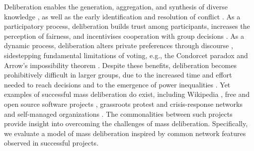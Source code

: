 \documentclass[twocolumn,10pt]{article}
\begin{document}
Deliberation enables the generation, aggregation, and synthesis of diverse knowledge \cite{dewey_creative_1940, anderson_epistemology_2006, ackerman_deliberation_2002, ostrom_collective_2000},
as well as the early identification and resolution of conflict \cite{gentry_consensus_1982}.
As a participatory process, deliberation builds trust among participants, increases the perception of fairness, and incentivises cooperation with group decisions
\cite{ostrom_collective_2000, bowles_endogenous_1998}.
As a dynamic process, deliberation alters private preferences through discourse \cite{habermas_structural_1991}, sidestepping fundamental limitations of voting, e.g., the Condorcet paradox \cite{condorcet_essay_1785, brandt_computational_2012} and Arrow's impossibility theorem \cite{arrow_social_2012, brandt_computational_2012}.
Despite these benefits, deliberation becomes prohibitively difficult in larger groups, due to the increased time and effort needed to reach decisions \cite{fishkin_voice_1997, gentry_consensus_1982} and to the emergence of power inequalities \cite{freeman_tyranny_1972, boehm_egalitarian_1993}.
Yet examples of successful mass deliberation do exist, including Wikipedia \cite{giles_internet_2005, keegan_evolution_2017}, free and open source software projects \cite{benkler_coases_2002}, grassroots protest and crisis-response networks \cite{gonzalez-bailon_networked_2016, brugh_combining_2019} and self-managed organizations \cite{laloux_reinventing_2014}.
The commonalities between such projects provide insight into overcoming the challenges of mass deliberation.
Specifically, we evaluate a model of mass deliberation inspired by common network features observed in successful projects.
\end{document}
